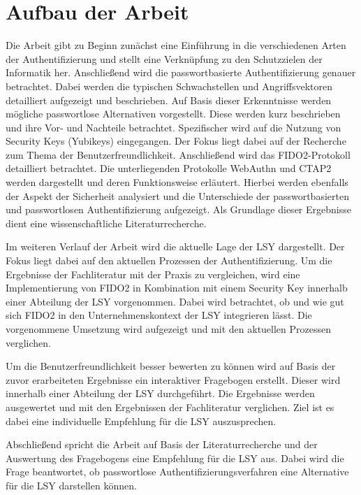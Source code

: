 \section{Aufbau der Arbeit}
Die Arbeit gibt zu Beginn zunächst eine Einführung in die verschiedenen Arten der Authentifizierung und stellt eine Verknüpfung zu den Schutzzielen der Informatik her. Anschließend wird die passwortbasierte Authentifizierung genauer betrachtet. Dabei werden die typischen Schwachstellen und Angriffsvektoren detailliert aufgezeigt und beschrieben. Auf Basis dieser Erkenntnisse werden mögliche passwortlose Alternativen vorgestellt. Diese werden kurz beschrieben und ihre Vor- und Nachteile betrachtet. Spezifischer wird auf die Nutzung von Security Keys (Yubikeys) eingegangen. Der Fokus liegt dabei auf der Recherche zum Thema der Benutzerfreundlichkeit. Anschließend wird das \ac{FIDO}2-Protokoll detailliert betrachtet. Die unterliegenden Protokolle WebAuthn und \ac{CTAP2} werden dargestellt und deren Funktionsweise erläutert. Hierbei werden ebenfalls der Aspekt der Sicherheit analysiert und die Unterschiede der passwortbasierten und passwortlosen Authentifizierung aufgezeigt. Als Grundlage dieser Ergebnisse dient eine wissenschaftliche Literaturrecherche.

Im weiteren Verlauf der Arbeit wird die aktuelle Lage der \ac{LSY} dargestellt. Der Fokus liegt dabei auf den aktuellen Prozessen der Authentifizierung. Um die Ergebnisse der Fachliteratur mit der Praxis zu vergleichen, wird eine Implementierung von \ac{FIDO}2 in Kombination mit einem Security Key innerhalb einer Abteilung der \ac{LSY} vorgenommen. Dabei wird betrachtet, ob und wie gut sich \ac{FIDO}2 in den Unternehmenskontext der \ac{LSY} integrieren lässt. Die vorgenommene Umsetzung wird aufgezeigt und mit den aktuellen Prozessen verglichen.

Um die Benutzerfreundlichkeit besser bewerten zu können wird auf Basis der zuvor erarbeiteten Ergebnisse ein interaktiver Fragebogen erstellt. Dieser wird innerhalb einer Abteilung der \ac{LSY} durchgeführt. Die Ergebnisse werden ausgewertet und mit den Ergebnissen der Fachliteratur verglichen. Ziel ist es dabei eine individuelle Empfehlung für die \ac{LSY} auszusprechen.

Abschließend spricht die Arbeit auf Basis der Literaturrecherche und der Auswertung des Fragebogens eine Empfehlung für die \ac{LSY} aus. Dabei wird die Frage beantwortet, ob passwortlose Authentifizierungsverfahren eine Alternative für die \ac{LSY} darstellen können.


